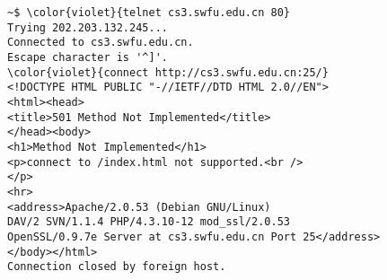 \documentclass[varwidth=33.2em,crop]{standalone}
\begin{document}
\pagestyle{empty}

\begin{Verbatim}[commandchars=\\\{\}]
~$ \color{violet}{telnet cs3.swfu.edu.cn 80}
Trying 202.203.132.245...
Connected to cs3.swfu.edu.cn.
Escape character is '^]'.
\color{violet}{connect http://cs3.swfu.edu.cn:25/}
<!DOCTYPE HTML PUBLIC "-//IETF//DTD HTML 2.0//EN">
<html><head>
<title>501 Method Not Implemented</title>
</head><body>
<h1>Method Not Implemented</h1>
<p>connect to /index.html not supported.<br />
</p>
<hr>
<address>Apache/2.0.53 (Debian GNU/Linux)
DAV/2 SVN/1.1.4 PHP/4.3.10-12 mod_ssl/2.0.53
OpenSSL/0.9.7e Server at cs3.swfu.edu.cn Port 25</address>
</body></html>
Connection closed by foreign host.
\end{Verbatim}
\end{document}
